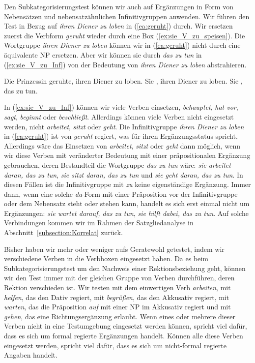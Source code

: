 Den Subkategorisierungstest können wir auch auf Ergänzungen in Form von Nebensätzen und nebensatzähnlichen Infinitivgruppen anwenden. Wir führen den Test in Bezug auf \textit{ihren Diener zu loben} in (\ref{ea:geruht}) durch. Wir ersetzen zuerst die Verbform \textit{geruht} wieder durch eine Box (\ref{ex:sie_V_zu_speisen}). Die Wortgruppe \textit{ihren Diener zu loben} können wir in (\ref{ea:geruht}) nicht durch eine äquivalente NP ersetzen. Aber wir können sie durch \textit{das zu tun} in (\ref{ex:sie_V_zu_Inf}) von der Bedeutung von \textit{ihren Diener zu loben} abstrahieren.

\ea \label{ea:Subkategorisierungstest6}
\ea \label{ea:geruht} Die Prinzessin geruhte, ihren Diener zu loben.
\ex \label{ex:sie_V_zu_speisen} Sie \fbox{\phantom{geruhte}}, ihren Diener zu loben.
\ex \label{ex:sie_V_zu_Inf} Sie \fbox{\phantom{geruhte}}, das zu tun.
\z 
\z   

In (\ref{ex:sie_V_zu_Inf}) können wir viele Verben einsetzen, \zB \textit{behauptet}, \textit{hat vor}, \textit{sagt}, \textit{beginnt} oder \textit{beschließt}. Allerdings können viele Verben nicht eingesetzt werden, \zB nicht \textit{arbeitet}, \textit{sitzt} oder \textit{geht}. Die Infinitivgruppe \textit{ihren Diener zu loben} in (\ref{ea:geruht}) ist von \textit{geruht} regiert, was für ihren Ergänzungsstatus spricht. Allerdings wäre das Einsetzen von \textit{arbeitet}, \textit{sitzt} oder \textit{geht} dann möglich, wenn wir diese Verben mit veränderter Bedeutung mit einer präpositionalen Ergänzung gebrauchen, deren Bestandteil die Wortgruppe \textit{das zu tun} wäre: \textit{sie arbeitet daran, das zu tun}, \textit{sie sitzt daran, das zu tun} und \textit{sie geht daran, das zu tun}. In diesen Fällen ist die Infinitivgruppe mit \textit{zu} keine eigenständige Ergänzung. Immer dann, wenn eine solche \textit{da}-Form mit einer Präposition vor der Infinitivgruppe oder dem Nebensatz steht oder stehen kann, handelt es sich erst einmal nicht um Ergänzungen: \textit{sie wartet darauf, das zu tun}, \textit{sie hilft dabei, das zu tun}. Auf solche Verbindungen kommen wir im Rahmen der Satzgliedanalyse in Abschnitt~\ref{subsection:Korrelat} zurück.

Bisher haben wir mehr oder weniger aufs Geratewohl getestet, indem wir verschiedene Verben in die Verbboxen eingesetzt haben. Da es beim Subkategorisierungstest um den Nachweis einer Rektionsbeziehung geht, können wir den Test immer mit der gleichen Gruppe von Verben durchführen, deren Rektion verschieden ist. Wir testen mit dem einwertigen Verb \textit{arbeiten}, mit \textit{helfen}, das den Dativ regiert, mit \textit{begrüßen}, das den Akkusativ regiert, mit \textit{warten}, das die Präposition \textit{auf} mit einer NP im Akkusativ regiert und mit \textit{gehen}, das eine Richtungsergänzung erlaubt. Wenn eines oder mehrere dieser Verben nicht in eine Testumgebung eingesetzt werden können, spricht viel dafür, dass es sich um formal regierte Ergänzungen handelt. Können alle diese Verben eingesetzt werden, spricht viel dafür, dass es sich um nicht-formal regierte Angaben handelt.

